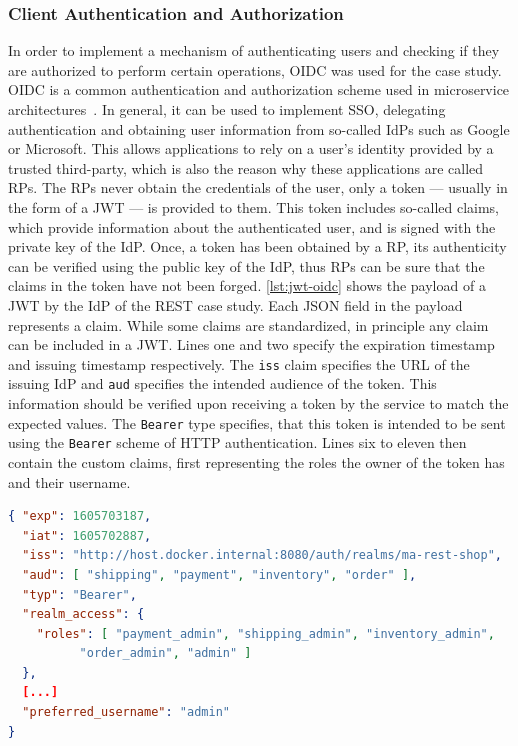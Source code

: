 \subsubsection{Client Authentication and Authorization}\label{sec:rest-auth}

In order to implement a mechanism of authenticating users and checking if they are authorized to perform certain operations, \ac{OIDC} was used for the case study.
\ac{OIDC} is a common authentication and authorization scheme used in microservice architectures~\cite{Nehme2019, Hammann2020}.
In general, it can be used to implement \ac{SSO}, delegating authentication and obtaining user information from so-called \acp{IdP} such as Google or Microsoft.
This allows applications to rely on a user's identity provided by a trusted third-party, which is also the reason why these applications are called \acp{RP}.
The \acp{RP} never obtain the credentials of the user, only a token --- usually in the form of a \ac{JWT} --- is provided to them.
This token includes so-called claims, which provide information about the authenticated user, and is signed with the private key of the \ac{IdP}.
Once, a token has been obtained by a \ac{RP}, its authenticity can be verified using the public key of the \ac{IdP}, thus \acp{RP} can be sure that the claims in the token have not been forged.
\autoref{lst:jwt-oidc} shows the payload of a \ac{JWT} by the \ac{IdP} of the \ac{REST} case study.
Each \ac{JSON} field in the payload represents a claim.
While some claims are standardized, in principle any claim can be included in a \ac{JWT}.
Lines one and two specify the expiration timestamp and issuing timestamp respectively.
The \texttt{iss} claim specifies the \ac{URL} of the issuing \ac{IdP} and \texttt{aud} specifies the intended audience of the token.
This information should be verified upon receiving a token by the service to match the expected values.
The \texttt{Bearer} type specifies, that this token is intended to be sent using the \texttt{Bearer} scheme of \ac{HTTP} authentication.
Lines six to eleven then contain the custom claims, first representing the roles the owner of the token has and their username.

\begin{lstlisting}[caption={\acs{JWT} Issued by an \acs{IdP}}, language=json, label={lst:jwt-oidc}]
{ "exp": 1605703187,
  "iat": 1605702887,
  "iss": "http://host.docker.internal:8080/auth/realms/ma-rest-shop",
  "aud": [ "shipping", "payment", "inventory", "order" ],
  "typ": "Bearer",
  "realm_access": {
    "roles": [ "payment_admin", "shipping_admin", "inventory_admin",
          "order_admin", "admin" ]
  },
  [...]
  "preferred_username": "admin"
}
\end{lstlisting}

